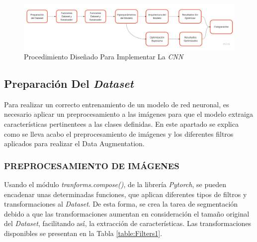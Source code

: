 	\begin{figure}[ht]
		\centering
		\includegraphics[scale=0.15]{Figs/procedimiento.jpg}
		\caption{Procedimiento Diseñado Para Implementar La \textit{CNN}}
		\label{fig:procedimiento}
	\end{figure}	


		\newpage
		\subsection{Preparación Del \textit{Dataset}}
		
		Para realizar un correcto entrenamiento de un modelo de red neuronal, es necesario aplicar un preprocesamiento a las imágenes para que el modelo extraiga características pertinentees a las clases definidas. En este apartado se explica como se lleva acabo el preprocesamiento de imágenes y los diferentes filtros aplicados para realizar el Data Augmentation.
		
			\subsubsection{PREPROCESAMIENTO DE IMÁGENES}

			Usando el módulo \textit{tranforms.compose()}, de la librería \textit{Pytorch}, se pueden encadenar unas determinadas funciones, que aplican diferentes tipos de filtros y transformaciones al \textit{Dataset}. De esta forma, se crea la tarea de segmentación debido a que las transformaciones aumentan en consideración el tamaño original del \textit{Dataset}, facilitando así, la extracción de características. Las transformaciones disponibles se presentan en la Tabla \ref{table:Filters1}.
			
